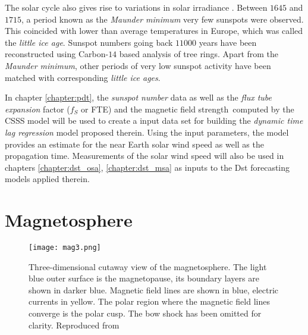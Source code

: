 The solar cycle also gives rise to variations in solar irradiance \citep{solarirradiance}. Between $1645$ and 
$1715$, a period known as the \emph{Maunder minimum} very few sunspots were observed. This coincided with lower 
than average temperatures in Europe, which was called the \emph{little ice age}. Sunspot numbers going back $11000$ 
years have been reconstructed using Carbon-$14$ based analysis of tree rings. Apart from the \emph{Maunder minimum},
other periods of very low sunspot activity have been matched with corresponding \emph{little ice ages}.

In chapter \ref{chapter:pdt}, the \emph{sunspot number} data as well as the \emph{flux tube expansion} factor ($f_S$ or FTE) 
and the magnetic field strength computed by the CSSS model will be used to create a input data set for building the 
\emph{dynamic time lag regression} model proposed therein. Using the input parameters, the \XX model provides an estimate 
for the near Earth solar wind speed as well as the propagation time. Measurements of the solar wind speed will also be used in 
chapters \ref{chapter:dst_osa}, \ref{chapter:dst_msa} as inputs to the Dst forecasting models applied therein.


\section{Magnetosphere}\label{sec:mag}


\begin{figure}
    \noindent\texttt{[image: mag3.png]}
    \caption{{\small Three-dimensional cutaway view of the magnetosphere. The light blue outer surface is the magnetopause, 
    its boundary layers are shown in darker blue. Magnetic field lines are shown in blue, electric currents in yellow. 
    The polar region where the magnetic field lines converge is the polar cusp. The bow shock has been omitted for clarity. 
    Reproduced from \citet{DeKeyser2005}}
    }
    \label{fig:magnetosphere}
\end{figure}

